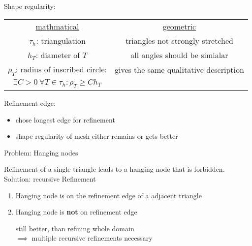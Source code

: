 Shape regularity:
\begin{center}
	\begin{tabular}{c | c}
		\underline{mathmatical} & \underline{geometric}\\
		$\tau_h$:  triangulation & triangles not strongly stretched \\
		$h_T$:  diameter of $T$ & all angles should be \glqq simialar \grqq \\
		$\rho_T$:  radius of inscribed circle:	& gives the same qualitative description\\
		$\exists C > 0\ \forall T \in \tau_h \colon \rho_T \geq C h_T$ & 
	\end{tabular}
\end{center}


Refinement edge:
\begin{itemize}
	\item chose longest edge for refinement
	\item shape regularity of mesh either remains or gets better
\end{itemize}

Problem: Hanging nodes

Refinement of a single triangle leads to a hanging node that is forbidden.\\
Solution: recursive Refinement
\begin{enumerate}[label= case \arabic*:]
	\item Hanging node is on the refinement edge of a adjacent triangle
	

	\item Hanging node is \textbf{not} on refinement edge
	
	still better, than refining whole domain\\
	$\implies$ multiple recursive refinements necessary
\end{enumerate}

